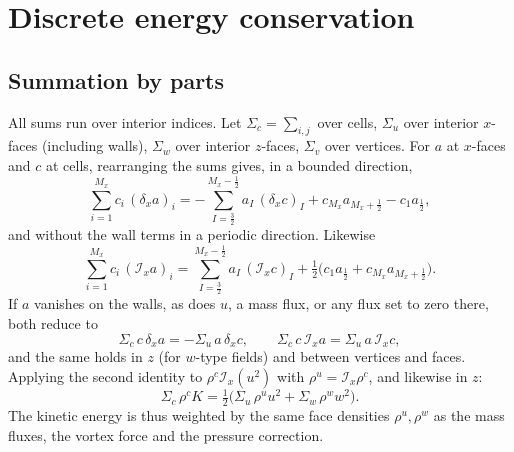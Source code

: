 \documentclass[11pt,a4paper]{article}
\newcommand{\dx}{\delta_x}
\newcommand{\Ix}{\mathcal{I}_x}
\begin{document}
\section{Discrete energy conservation}\label{sec:econs}
\subsection{Summation by parts}
All sums run over interior indices. Let $\Sigma_c=\sum_{i,j}$ over cells, $\Sigma_u$ over interior $x$-faces (including walls), $\Sigma_w$ over interior $z$-faces, $\Sigma_v$ over vertices.
For $a$ at $x$-faces and $c$ at cells, rearranging the sums gives, in a bounded direction,
\begin{equation}
  \sum_{i=1}^{M_x}c_i\,(\dx a)_i=-\sum_{I=\frac32}^{M_x-\frac12}a_I\,(\dx c)_I+c_{M_x}a_{M_x+\frac12}-c_1a_{\frac12},
  \label{eq:sbp1}
\end{equation}
and without the wall terms in a periodic direction. Likewise
\begin{equation}
  \sum_{i=1}^{M_x}c_i\,(\Ix a)_i=\sum_{I=\frac32}^{M_x-\frac12}a_I\,(\Ix c)_I+\tfrac12\big(c_1a_{\frac12}+c_{M_x}a_{M_x+\frac12}\big).
  \label{eq:sbp2}
\end{equation}
If $a$ vanishes on the walls, as does $u$, a mass flux, or any flux set to zero there, both reduce to
\begin{equation}
  \Sigma_c\,c\,\dx a=-\Sigma_u\,a\,\dx c,\qquad \Sigma_c\,c\,\Ix a=\Sigma_u\,a\,\Ix c,
  \label{eq:sbp}
\end{equation}
and the same holds in $z$ (for $w$-type fields) and between vertices and faces. Applying the second identity to $\rho^c\Ix(u^2)$ with $\rho^u=\Ix\rho^c$, and likewise in $z$:
\begin{equation}
  \Sigma_c\,\rho^cK=\tfrac12\Big(\Sigma_u\,\rho^uu^2+\Sigma_w\,\rho^ww^2\Big).
  \label{eq:EK}
\end{equation}
The kinetic energy is thus weighted by the same face densities $\rho^u,\rho^w$ as the mass fluxes, the vortex force and the pressure correction.
\end{document}
